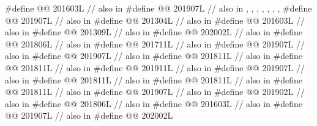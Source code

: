 \begin{codeblock}
#define @@                              201603L // also in 
#define @@                           201907L
  // also in , , , , , , , 
#define @@                            201907L // also in 
#define @@                       201304L // also in 
#define @@                             201603L // also in 
#define @@                      201309L // also in 
#define @@                          202002L // also in 
#define @@              201806L // also in 
#define @@                 201711L // also in 
#define @@           201907L // also in 
#define @@              201907L // also in 
#define @@                201811L // also in 
#define @@                  201811L // also in 
#define @@                 201911L // also in 
#define @@                  201907L // also in 
#define @@             201811L // also in 
#define @@                   201811L // also in 
#define @@                 201811L // also in 
#define @@                  201907L // also in 
#define @@                         201902L // also in 
#define @@                 201806L // also in 
#define @@           201603L // also in 
#define @@                            201907L // also in 
#define @@                          202002L

\end{codeblock}
